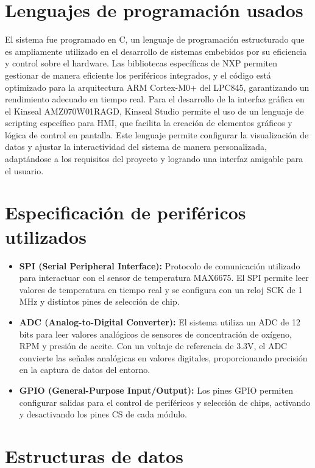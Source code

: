     
\section{Lenguajes de programación usados}
El sistema fue programado en C, un lenguaje de programación estructurado que es ampliamente utilizado en el desarrollo de sistemas embebidos por su eficiencia y control sobre el hardware. Las bibliotecas específicas de NXP permiten gestionar de manera eficiente los periféricos integrados, y el código está optimizado para la arquitectura ARM Cortex-M0+ del LPC845, garantizando un rendimiento adecuado en tiempo real. Para el desarrollo de la interfaz gráfica en el Kinseal AMZ070W01RAGD, Kinseal Studio permite el uso de un lenguaje de scripting específico para HMI, que facilita la creación de elementos gráficos y lógica de control en pantalla. Este lenguaje permite configurar la visualización de datos y ajustar la interactividad del sistema de manera personalizada, adaptándose a los requisitos del proyecto y logrando una interfaz amigable para el usuario.

\section{Especificación de periféricos utilizados}

\begin{itemize}
    \item \textbf{SPI (Serial Peripheral Interface):} Protocolo de comunicación utilizado para interactuar con el sensor de temperatura MAX6675. El SPI permite leer valores de temperatura en tiempo real y se configura con un reloj SCK de 1 MHz y distintos pines de selección de chip.
    
    \item \textbf{ADC (Analog-to-Digital Converter):} El sistema utiliza un ADC de 12 bits para leer valores analógicos de sensores de concentración de oxígeno, RPM y presión de aceite. Con un voltaje de referencia de 3.3V, el ADC convierte las señales analógicas en valores digitales, proporcionando precisión en la captura de datos del entorno.
    
    \item \textbf{GPIO (General-Purpose Input/Output):} Los pines GPIO permiten configurar salidas para el control de periféricos y selección de chips, activando y desactivando los pines CS de cada módulo.
\end{itemize}

\section{Estructuras de datos}

